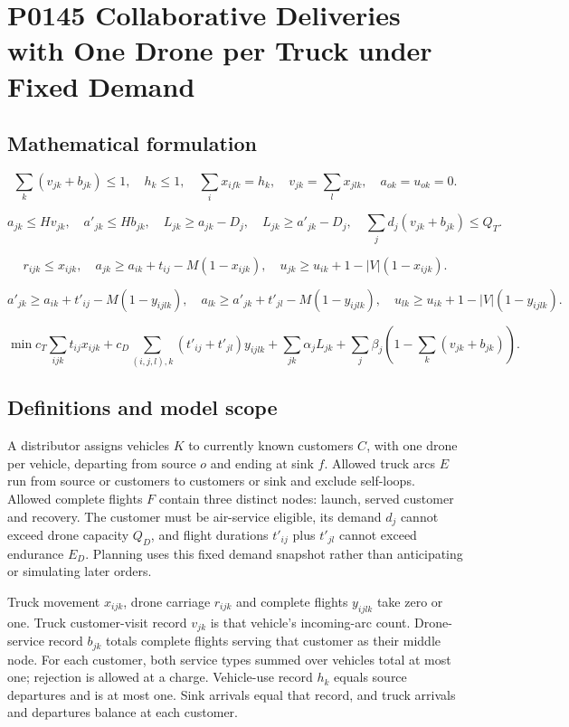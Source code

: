\documentclass[10pt]{article}
\begin{document}
\section*{P0145 Collaborative Deliveries with One Drone per Truck under Fixed Demand}
\subsection*{Mathematical formulation}
\[
\sum_k(v_{jk}+b_{jk})\le1,\quad h_k\le1,\quad
\sum_ix_{ifk}=h_k,\quad v_{jk}=\sum_lx_{jlk},\quad a_{ok}=u_{ok}=0.
\]

\[
a_{jk}\le Hv_{jk},\quad a'_{jk}\le Hb_{jk},\quad
L_{jk}\ge a_{jk}-D_j,\quad L_{jk}\ge a'_{jk}-D_j,\quad
\sum_jd_j(v_{jk}+b_{jk})\le Q_T.
\]

\[
r_{ijk}\le x_{ijk},\quad
a_{jk}\ge a_{ik}+t_{ij}-M(1-x_{ijk}),\quad
u_{jk}\ge u_{ik}+1-|V|(1-x_{ijk}).
\]

\[
a'_{jk}\ge a_{ik}+t'_{ij}-M(1-y_{ijlk}),\quad
a_{lk}\ge a'_{jk}+t'_{jl}-M(1-y_{ijlk}),\quad
u_{lk}\ge u_{ik}+1-|V|(1-y_{ijlk}).
\]

\[
\min c_T\sum_{ijk}t_{ij}x_{ijk}
+c_D\sum_{(i,j,l),k}(t'_{ij}+t'_{jl})y_{ijlk}
+\sum_{jk}\alpha_jL_{jk}
+\sum_j\beta_j(1-\sum_k(v_{jk}+b_{jk})).
\]

\subsection*{Definitions and model scope}
A distributor assigns vehicles $K$ to currently known customers $C$, with one drone per vehicle, departing from source $o$ and ending at sink $f$. Allowed truck arcs $E$ run from source or customers to customers or sink and exclude self-loops. Allowed complete flights $F$ contain three distinct nodes: launch, served customer and recovery. The customer must be air-service eligible, its demand $d_j$ cannot exceed drone capacity $Q_D$, and flight durations $t'_{ij}$ plus $t'_{jl}$ cannot exceed endurance $E_D$. Planning uses this fixed demand snapshot rather than anticipating or simulating later orders.

Truck movement $x_{ijk}$, drone carriage $r_{ijk}$ and complete flights $y_{ijlk}$ take zero or one. Truck customer-visit record $v_{jk}$ is that vehicle's incoming-arc count. Drone-service record $b_{jk}$ totals complete flights serving that customer as their middle node. For each customer, both service types summed over vehicles total at most one; rejection is allowed at a charge. Vehicle-use record $h_k$ equals source departures and is at most one. Sink arrivals equal that record, and truck arrivals and departures balance at each customer.
\end{document}
